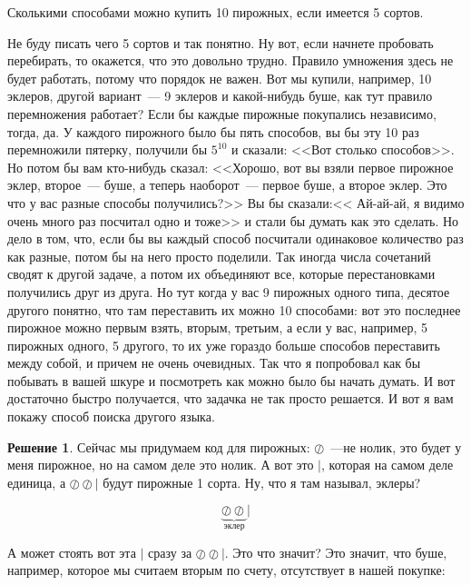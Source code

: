 \documentclass[russian]{lecture-notes}
\theoremstyle{definition}
\newtheorem*{solution}{Решение}
\begin{document}
\begin{enumerate}
		
		\begin{problem}
			Сколькими способами можно купить 10 пирожных, если имеется 5 сортов.
		\end{problem}
	
		Не буду писать чего 5 сортов и так понятно. Ну вот, если начнете пробовать перебирать, то окажется, что это довольно трудно. Правило умножения здесь не будет работать, потому что порядок не важен. Вот мы купили, например, 10 эклеров, другой вариант~--- 9 эклеров и какой-нибудь буше, как тут правило перемножения работает? Если бы каждые пирожные покупались независимо, тогда, да. У каждого пирожного было бы пять способов, вы бы эту 10 раз перемножили пятерку, получили бы $5^{10}$ и сказали: <<Вот столько способов>>. Но потом бы вам кто-нибудь сказал: <<Хорошо, вот вы взяли первое пирожное эклер, второе~--- буше, а теперь наоборот~--- первое буше, а второе эклер. Это что у вас разные способы получились?>> Вы бы сказали:<< Ай-ай-ай, я видимо очень много раз посчитал одно и тоже>> и стали бы думать как это сделать. Но дело в том, что, если бы вы каждый способ посчитали одинаковое количество раз как разные, потом бы на него просто поделили. Так иногда числа сочетаний сводят к другой задаче, а потом их объединяют все, которые перестановками получились друг из друга. Но тут когда у вас 9 пирожных одного типа, десятое другого понятно, что там переставить их можно 10 способами: вот это последнее пирожное можно первым взять, вторым, третьим, а если у вас, например, 5 пирожных одного, 5 другого, то их уже гораздо больше способов переставить между собой, и причем не очень очевидных. Так что я попробовал как бы побывать в вашей шкуре и посмотреть как можно было бы начать думать. И вот достаточно быстро получается, что задачка не так просто решается. И вот я вам покажу способ поиска другого языка.
		
		\begin{solution}
			Сейчас мы придумаем код для пирожных: $\oslash$~---не нолик, это будет у меня пирожное, но на самом деле это нолик. А вот это $|$, которая на самом деле единица, а $\oslash \oslash |$ будут пирожные 1 сорта. Ну, что я там называл, эклеры?
			
			\[
				\underbrace{\oslash \oslash}_{\text{эклер}} |
			\]
			
			А может стоять вот эта $|$ сразу за $\oslash \oslash |$. Это что значит? Это значит, что буше, например, которое мы считаем вторым по счету, отсутствует в нашей покупке:
			

\end{solution}
\end{enumerate}
\end{document}
